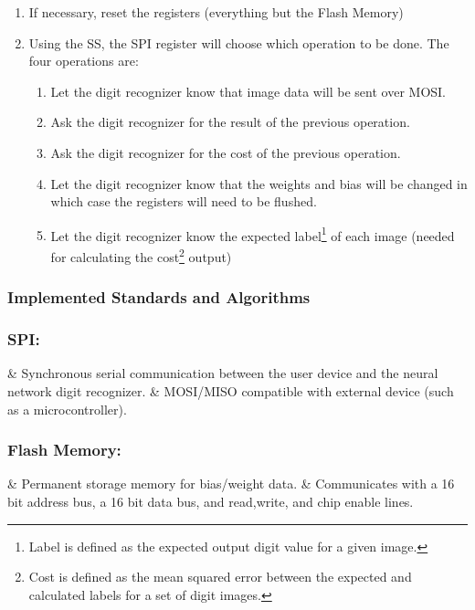 \documentclass[12pt]{article}
\begin{document}
\begin{enumerate}
    \item If necessary, reset the registers (everything but the Flash Memory)
    \item Using the SS, the SPI register will choose which operation to be done. The four operations are:
        \begin{enumerate}
            \item Let the digit recognizer know that image data will be sent over MOSI.
            \item Ask the digit recognizer for the result of the previous operation.
            \item Ask the digit recognizer for the cost of the previous operation.
            \item Let the digit recognizer know that the weights and bias will be changed in which case the registers will need to be flushed.
            \item Let the digit recognizer know the expected label\footnote{Label is defined as the expected output digit value for a given image.} of each image (needed for calculating the cost\footnote{Cost is defined as the mean squared error between the expected and calculated labels for a set of digit images.} output)
        \end{enumerate}
\end{enumerate}
\newpage

\subsubsection{Implemented Standards and Algorithms\label{sec:standards}}

\subsubsection*{SPI:}

\begin{easylist}[itemize]
& Synchronous serial communication between the user device and the neural network digit recognizer.
& MOSI/MISO compatible with external device (such as a microcontroller).
\end{easylist}



\subsubsection*{Flash Memory:}

\begin{easylist}
& Permanent storage memory for bias/weight data.
& Communicates with a 16 bit address bus, a 16 bit data bus, and read,write, and chip enable lines.
\end{easylist}
\end{document}
